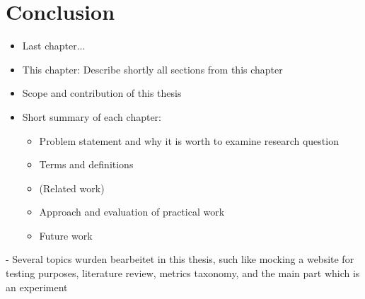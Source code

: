 \chapter{Conclusion}

\begin{itemize}
	\item Last chapter...
	\item This chapter: Describe shortly all sections from this chapter
\end{itemize}

\begin{itemize}
\item Scope and contribution of this thesis
\item Short summary of each chapter:
	\begin{itemize}
	\item Problem statement and why it is worth to examine research question
	\item Terms and definitions
	\item (Related work)
	\item Approach and evaluation of practical work
	\item Future work
	\end{itemize}
\end{itemize}


- Several topics wurden bearbeitet in this thesis, such like mocking a website for testing purposes, literature review, metrics taxonomy, and the main part which is an experiment 